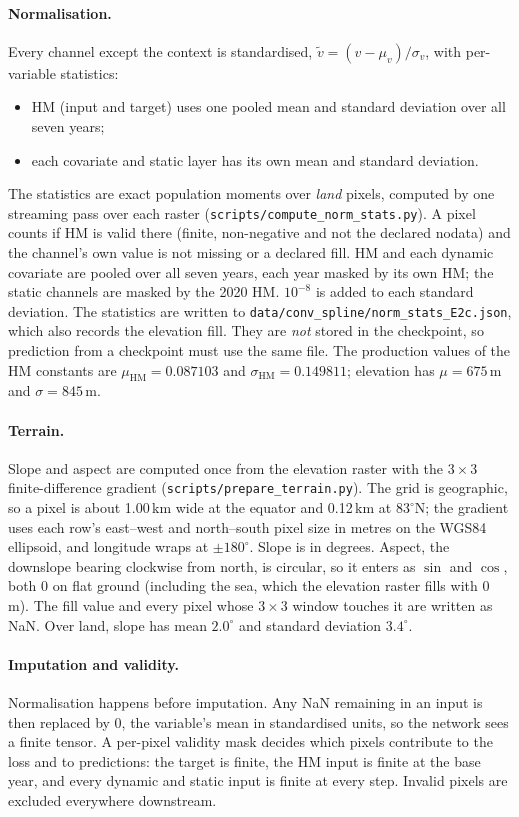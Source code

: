\documentclass[11pt,a4paper]{article}
\newcommand{\HM}{\mathrm{HM}}
\newcommand{\code}[1]{\texttt{\small #1}}
\begin{document}
\paragraph{Normalisation.} Every channel except the context is standardised,
$\tilde v = (v-\mu_v)/\sigma_v$, with per-variable statistics:
\begin{itemize}
\item HM (input and target) uses one pooled mean and standard deviation over all seven years;
\item each covariate and static layer has its own mean and standard deviation.
\end{itemize}
The statistics are exact population moments over \emph{land} pixels, computed by one streaming
pass over each raster (\code{scripts/compute\_norm\_stats.py}). A pixel counts if HM is valid there
(finite, non-negative and not the declared nodata) and the channel's own value is not missing or a
declared fill. HM and each dynamic covariate are pooled over all seven years, each year masked by
its own HM; the static channels are masked by the 2020 HM. $10^{-8}$ is added to each standard
deviation. The statistics are written to \code{data/conv\_spline/}\allowbreak\code{norm\_stats\_E2c.json}, which also
records the elevation fill. They are \emph{not} stored in the checkpoint, so prediction from a
checkpoint must use the same file. The production values of the HM constants are
$\mu_{\HM}=0.087103$ and $\sigma_{\HM}=0.149811$; elevation has $\mu=675$\,m and $\sigma=845$\,m.

\paragraph{Terrain.} Slope and aspect are computed once from the elevation raster with the
\citet{horn} $3\times3$ finite-difference gradient (\code{scripts/prepare\_terrain.py}).
The grid is geographic, so a pixel is about 1.00\,km wide at the equator and 0.12\,km at
$83^\circ$N; the gradient uses each row's east--west and north--south pixel size in metres on
the WGS84 ellipsoid, and longitude wraps at $\pm180^\circ$. Slope is in degrees. Aspect, the
downslope bearing clockwise from north, is circular, so it enters as $\sin$ and $\cos$, both 0 on
flat ground (including the sea, which the elevation raster fills with 0\,m). The fill value and
every pixel whose $3\times3$ window touches it are written as NaN. Over land, slope has mean
$2.0^\circ$ and standard deviation $3.4^\circ$.

\paragraph{Imputation and validity.} Normalisation happens before imputation. Any NaN remaining
in an input is then replaced by 0, the variable's mean in standardised units, so the network sees
a finite tensor. A per-pixel validity mask decides which pixels contribute to the loss and to
predictions: the target is finite, the HM input is finite at the base year, and every dynamic and
static input is finite at every step. Invalid pixels are excluded everywhere downstream.
\end{document}
